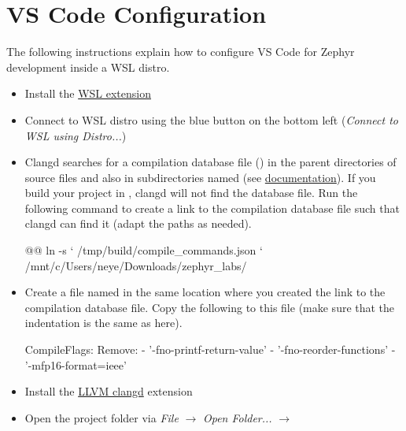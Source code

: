 \section{VS Code Configuration}

The following instructions explain how to configure VS Code for Zephyr development inside a WSL distro.

\begin{itemize}
  \item Install the \href{https://marketplace.visualstudio.com/items?itemName=ms-vscode-remote.remote-wsl}{WSL extension}
  \item Connect to WSL distro using the blue button on the bottom left (\emph{Connect to WSL using Distro...})
  \item Clangd searches for a compilation database file () in the parent directories of source files and also in subdirectories named  (see \href{https://clangd.llvm.org/installation#project-setup}{documentation}).
    If you build your project in , clangd will not find the database file.
    Run the following command to create a link to the compilation database file such that clangd can find it (adapt the paths as needed).

\begin{monobox}
@\cmdinwsl{}@ ln -s `
  /tmp/build/compile_commands.json `
  /mnt/c/Users/neye/Downloads/zephyr_labs/
\end{monobox}
  \item Create a file named  in the same location where you created the link to the compilation database file.
    Copy the following to this file (make sure that the indentation is the same as here).

\begin{monobox}
CompileFlags:
  Remove:
    - '-fno-printf-return-value'
    - '-fno-reorder-functions'
    - '-mfp16-format=ieee'
\end{monobox}
  \item Install the \href{https://marketplace.visualstudio.com/items?itemName=llvm-vs-code-extensions.vscode-clangd}{LLVM clangd} extension
  \item Open the project folder via \emph{File} $\rightarrow$ \emph{Open Folder...} $\rightarrow$ 
\end{itemize}
